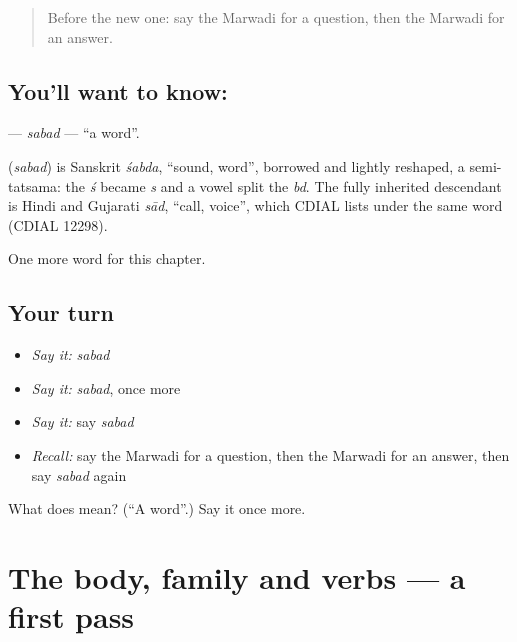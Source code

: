 \label{lesson:MW-C66-sabad}



\begin{quote}
Before the new one: say the Marwadi for a question, then the Marwadi for an answer.
\end{quote}

\subsection*{You'll want to know: }
\textbf{} — \emph{sabad} — \textquotedblleft{}a word\textquotedblright{}.

\begin{cousinweb}
\textbf{} (\emph{sabad}) is Sanskrit \emph{śabda}, \textquotedblleft{}sound, word\textquotedblright{}, borrowed and lightly reshaped, a semi-tatsama: the \emph{ś} became \emph{s} and a vowel split the \emph{bd}. The fully inherited descendant is Hindi and Gujarati \emph{sād}, \textquotedblleft{}call, voice\textquotedblright{}, which CDIAL lists under the same word (CDIAL 12298).
\end{cousinweb}

\begin{grammarlens}[title={What you've built}]
One more word for this chapter.
\end{grammarlens}

\subsection*{Your turn}
\begin{itemize}
\raggedright
  \item \emph{Say it:} \emph{sabad}
  \item \emph{Say it:} \emph{sabad}, once more
  \item \emph{Say it:} say \emph{sabad}
  \item \emph{Recall:} say the Marwadi for a question, then the Marwadi for an answer, then say \emph{sabad} again
\end{itemize}

\begin{tcolorbox}[breakable,colback=teal!4,colframe=teal!35!black,title={Before you move on}]
What does  mean? (\textquotedblleft{}A word\textquotedblright{}.) Say it once more.
\end{tcolorbox}
\section[(dialogue)]{The body, family and verbs — a first pass}

